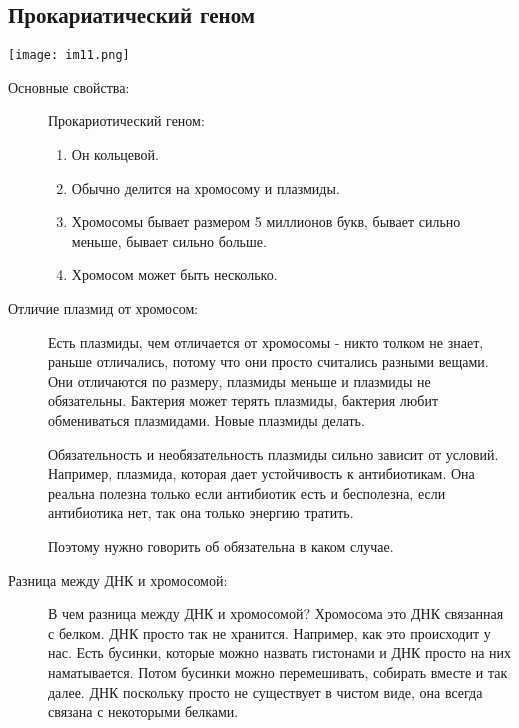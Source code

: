 \subsection{Прокариатический геном}
\texttt{[image: im11.png]}
\begin{description}
\item[Основные свойства:]
Прокариотический геном: 
\begin{enumerate}
\item Он кольцевой. 
\item Обычно делится на хромосому и плазмиды. 
\item Хромосомы бывает размером 5 миллионов букв, бывает сильно меньше, 
бывает сильно больше. 
\item Хромосом может быть несколько.   
\end{enumerate}

\item[Отличие плазмид от хромосом:]
Есть плазмиды, чем отличается от хромосомы - никто толком не знает, 
раньше отличались, потому что они просто считались разными вещами.
Они отличаются по размеру, плазмиды меньше и плазмиды не 
обязательны. Бактерия может терять плазмиды, бактерия любит 
обмениваться плазмидами. Новые плазмиды делать. 

Обязательность и необязательность плазмиды сильно зависит от условий.
Например, плазмида, которая дает
устойчивость к антибиотикам. Она реальна полезна только
если антибиотик есть и бесполезна, если антибиотика нет,
так она только энергию тратить.

Поэтому нужно говорить об обязательна в каком случае.

\item[Разница между ДНК и хромосомой:]
В чем разница между ДНК и хромосомой?
Хромосома это ДНК связанная с  белком. ДНК
просто так не хранится. Например,
как это происходит у нас. Есть бусинки,
которые можно назвать гистонами и ДНК просто на них
наматывается. Потом бусинки можно перемешивать,
собирать вместе и так далее. ДНК поскольку
просто не существует в чистом виде, она
всегда связана с некоторыми белками.
\end{description}

